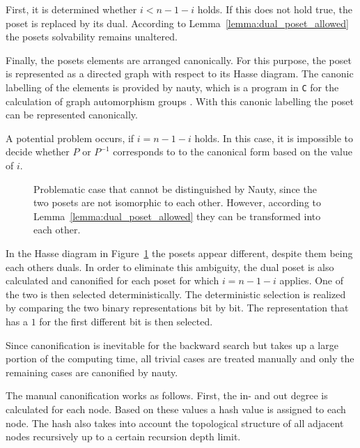 \documentclass[10pt,journal,compsoc]{IEEEtran}
\begin{document}
First, it is determined whether $i < n - 1 - i$ holds.
If this does not hold true, the poset is replaced by its dual.
According to Lemma~\ref{lemma:dual_poset_allowed} the posets solvability remains unaltered.

Finally, the posets elements are arranged canonically.
For this purpose, the poset is represented as a directed graph with respect to its Hasse diagram.
The canonic labelling of the elements is provided by nauty, which is a program in \texttt{C} for the calculation of graph automorphism groups \cite[Practical Graph Isomorphism]{MCKAY201494}.
With this canonic labelling the poset can be represented canonically.

A potential problem occurs, if $i = n - 1 - i$ holds.
In this case, it is impossible to decide whether $P$ or $P^{-1}$ corresponds to to the canonical form based on the value of $i$.

\begin{figure}[!b]
  \centering
  
  \caption{Problematic case that cannot be distinguished by Nauty, since the two posets are not isomorphic to each other. However, according to Lemma~\ref{lemma:dual_poset_allowed} they can be transformed into each other.}
  \label{fig:backward_canonify_problematic}
\end{figure}

In the Hasse diagram in Figure~\ref{fig:backward_canonify_problematic} the posets appear different, despite them being each others duals.
In order to eliminate this ambiguity, the dual poset is also calculated and canonified for each poset for which $i = n - 1 - i$ applies.
One of the two is then selected deterministically.
The deterministic selection is realized by comparing the two binary representations bit by bit.
The representation that has a $1$ for the first different bit is then selected.

Since canonification is inevitable for the backward search but takes up a large portion of the computing time, all trivial cases are treated manually and only the remaining cases are canonified by nauty.

The manual canonification works as follows.
First, the in- and out degree is calculated for each node.
Based on these values a hash value is assigned to each node.
The hash also takes into account the topological structure of all adjacent nodes recursively up to a certain recursion depth limit.
\end{document}
